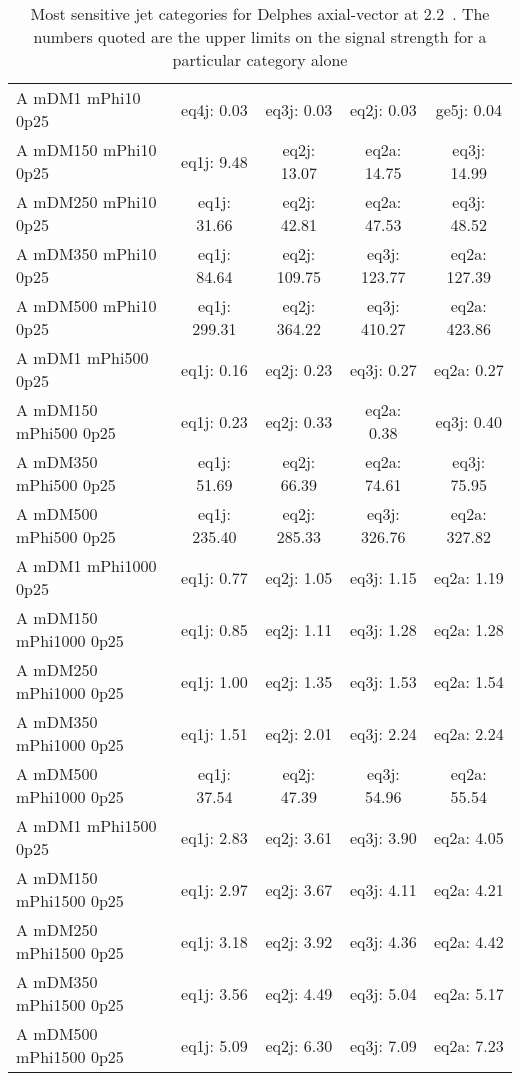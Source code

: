 \begin{table}
\begin{center}
\footnotesize
\caption{Most sensitive jet categories for Delphes axial-vector at 2.2~\ifb. The numbers quoted are the upper limits on the signal strength for a particular category alone}
\begin{tabular}{|l|c|c|c|c|}
\hline
 A mDM1 mPhi10 0p25 & eq4j: 0.03 & eq3j: 0.03 & eq2j: 0.03 & ge5j: 0.04 \\ 
 A mDM150 mPhi10 0p25 & eq1j: 9.48 & eq2j: 13.07 & eq2a: 14.75 & eq3j: 14.99 \\ 
 A mDM250 mPhi10 0p25 & eq1j: 31.66 & eq2j: 42.81 & eq2a: 47.53 & eq3j: 48.52 \\ 
 A mDM350 mPhi10 0p25 & eq1j: 84.64 & eq2j: 109.75 & eq3j: 123.77 & eq2a: 127.39 \\ 
 A mDM500 mPhi10 0p25 & eq1j: 299.31 & eq2j: 364.22 & eq3j: 410.27 & eq2a: 423.86 \\ 
 A mDM1 mPhi500 0p25 & eq1j: 0.16 & eq2j: 0.23 & eq3j: 0.27 & eq2a: 0.27 \\ 
 A mDM150 mPhi500 0p25 & eq1j: 0.23 & eq2j: 0.33 & eq2a: 0.38 & eq3j: 0.40 \\ 
 A mDM350 mPhi500 0p25 & eq1j: 51.69 & eq2j: 66.39 & eq2a: 74.61 & eq3j: 75.95 \\ 
 A mDM500 mPhi500 0p25 & eq1j: 235.40 & eq2j: 285.33 & eq3j: 326.76 & eq2a: 327.82 \\ 
 A mDM1 mPhi1000 0p25 & eq1j: 0.77 & eq2j: 1.05 & eq3j: 1.15 & eq2a: 1.19 \\ 
 A mDM150 mPhi1000 0p25 & eq1j: 0.85 & eq2j: 1.11 & eq3j: 1.28 & eq2a: 1.28 \\ 
 A mDM250 mPhi1000 0p25 & eq1j: 1.00 & eq2j: 1.35 & eq3j: 1.53 & eq2a: 1.54 \\ 
 A mDM350 mPhi1000 0p25 & eq1j: 1.51 & eq2j: 2.01 & eq3j: 2.24 & eq2a: 2.24 \\ 
 A mDM500 mPhi1000 0p25 & eq1j: 37.54 & eq2j: 47.39 & eq3j: 54.96 & eq2a: 55.54 \\ 
 A mDM1 mPhi1500 0p25 & eq1j: 2.83 & eq2j: 3.61 & eq3j: 3.90 & eq2a: 4.05 \\ 
 A mDM150 mPhi1500 0p25 & eq1j: 2.97 & eq2j: 3.67 & eq3j: 4.11 & eq2a: 4.21 \\ 
 A mDM250 mPhi1500 0p25 & eq1j: 3.18 & eq2j: 3.92 & eq3j: 4.36 & eq2a: 4.42 \\ 
 A mDM350 mPhi1500 0p25 & eq1j: 3.56 & eq2j: 4.49 & eq3j: 5.04 & eq2a: 5.17 \\ 
 A mDM500 mPhi1500 0p25 & eq1j: 5.09 & eq2j: 6.30 & eq3j: 7.09 & eq2a: 7.23 \\ 

\end{tabular}
\end{center}
\end{table}
